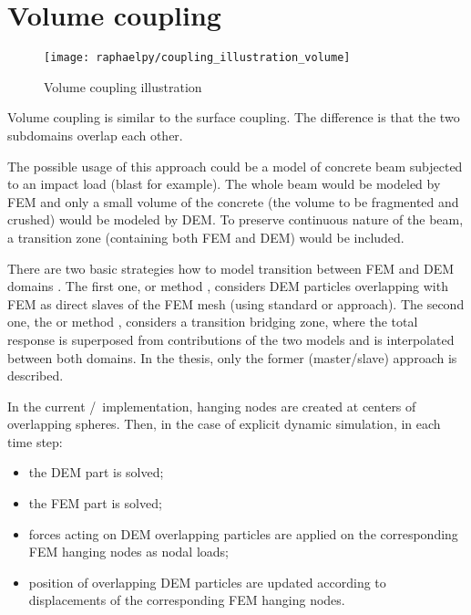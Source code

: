\section{Volume coupling}

\begin{figure}[htbp]
	\centering
	\texttt{[image: raphaelpy/coupling\_illustration\_volume]}
	\caption{Volume coupling illustration}
\end{figure}

Volume coupling \cite{RousseauFranginMarinDaudville2009a,XuGracieBelytschko2002a,AzevedoLemos2006a,WellmannWriggers2012a}
is similar to the surface coupling.
The difference is that the two subdomains overlap each other.

The possible usage of this approach could be a model of concrete beam subjected to an impact load (blast for example).
The whole beam would be modeled by FEM and only a small volume of the
concrete (the volume to be fragmented and crushed) would be modeled by DEM.
To preserve continuous nature of the beam, a transition zone (containing both FEM and DEM) would be included.

There are two basic strategies how to model transition between FEM and DEM domains \cite{XuGracieBelytschko2002a}.
The first one,  or  method \cite{AzevedoLemos2006a}, considers DEM particles overlapping with FEM as direct slaves of the FEM mesh (using standard  or  approach).
The second one, the  or  method \cite{RousseauFranginMarinDaudville2009a,WellmannWriggers2012a}, considers a transition bridging zone, where the total response is superposed from contributions of the two models and is interpolated between both domains.
In the thesis, only the former (master/slave) approach is described.

In the current \OOFEM/\YADE\ implementation, hanging nodes are created at centers of overlapping spheres.
Then, in the case of explicit dynamic simulation, in each time step:
\begin{itemize}
	\item the DEM part is solved;
	\item the FEM part is solved;
	\item forces acting on DEM overlapping particles are applied on the corresponding FEM hanging nodes as nodal loads;
	\item position of overlapping DEM particles are updated according to displacements of the corresponding FEM hanging nodes.
\end{itemize}


